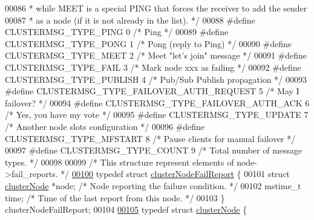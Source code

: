 \begin{DoxyCode}
00086 \textcolor{comment}{ * while MEET is a special PING that forces the receiver to add the sender}
00087 \textcolor{comment}{ * as a node (if it is not already in the list). */}
00088 \textcolor{preprocessor}{#}\textcolor{preprocessor}{define} \textcolor{preprocessor}{CLUSTERMSG\_TYPE\_PING} 0          \textcolor{comment}{/* Ping */}
00089 \textcolor{preprocessor}{#}\textcolor{preprocessor}{define} \textcolor{preprocessor}{CLUSTERMSG\_TYPE\_PONG} 1          \textcolor{comment}{/* Pong (reply to Ping) */}
00090 \textcolor{preprocessor}{#}\textcolor{preprocessor}{define} \textcolor{preprocessor}{CLUSTERMSG\_TYPE\_MEET} 2          \textcolor{comment}{/* Meet "let's join" message */}
00091 \textcolor{preprocessor}{#}\textcolor{preprocessor}{define} \textcolor{preprocessor}{CLUSTERMSG\_TYPE\_FAIL} 3          \textcolor{comment}{/* Mark node xxx as failing */}
00092 \textcolor{preprocessor}{#}\textcolor{preprocessor}{define} \textcolor{preprocessor}{CLUSTERMSG\_TYPE\_PUBLISH} 4       \textcolor{comment}{/* Pub/Sub Publish propagation */}
00093 \textcolor{preprocessor}{#}\textcolor{preprocessor}{define} \textcolor{preprocessor}{CLUSTERMSG\_TYPE\_FAILOVER\_AUTH\_REQUEST} 5 \textcolor{comment}{/* May I failover? */}
00094 \textcolor{preprocessor}{#}\textcolor{preprocessor}{define} \textcolor{preprocessor}{CLUSTERMSG\_TYPE\_FAILOVER\_AUTH\_ACK} 6     \textcolor{comment}{/* Yes, you have my vote */}
00095 \textcolor{preprocessor}{#}\textcolor{preprocessor}{define} \textcolor{preprocessor}{CLUSTERMSG\_TYPE\_UPDATE} 7        \textcolor{comment}{/* Another node slots configuration */}
00096 \textcolor{preprocessor}{#}\textcolor{preprocessor}{define} \textcolor{preprocessor}{CLUSTERMSG\_TYPE\_MFSTART} 8       \textcolor{comment}{/* Pause clients for manual failover */}
00097 \textcolor{preprocessor}{#}\textcolor{preprocessor}{define} \textcolor{preprocessor}{CLUSTERMSG\_TYPE\_COUNT} 9         \textcolor{comment}{/* Total number of message types. */}
00098 
00099 \textcolor{comment}{/* This structure represent elements of node->fail\_reports. */}
\hyperlink{structclusterNodeFailReport}{00100} \textcolor{keyword}{typedef} \textcolor{keyword}{struct} \hyperlink{structclusterNodeFailReport}{clusterNodeFailReport} \{
00101     \textcolor{keyword}{struct} \hyperlink{structclusterNode}{clusterNode} *node;  \textcolor{comment}{/* Node reporting the failure condition. */}
00102     mstime\_t time;             \textcolor{comment}{/* Time of the last report from this node. */}
00103 \} clusterNodeFailReport;
00104 
\hyperlink{structclusterNode}{00105} \textcolor{keyword}{typedef} \textcolor{keyword}{struct} \hyperlink{structclusterNode}{clusterNode} \{

\end{DoxyCode}

